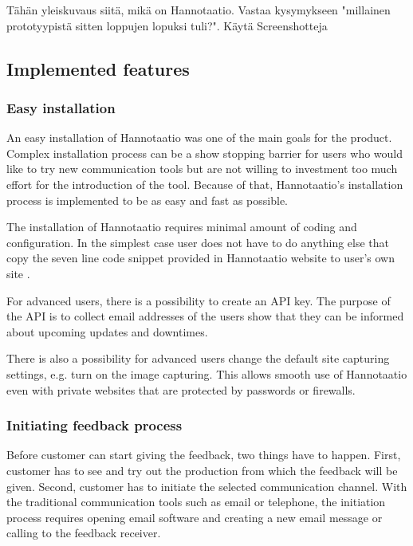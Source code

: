 \documentclass[english,12pt,a4paper,pdftex]{article}
\begin{document}
Tähän yleiskuvaus siitä, mikä on Hannotaatio. Vastaa kysymykseen "millainen prototyypistä sitten loppujen lopuksi tuli?". Käytä Screenshotteja

\subsection{Implemented features}

\subsubsection{Easy installation}

An easy installation of Hannotaatio was one of the main goals for the product. Complex installation process can be a show stopping barrier for users who would like to try new communication tools but are not willing to investment too much effort for the introduction of the tool. Because of that, Hannotaatio's installation process is implemented to be as easy and fast as possible.

The installation of Hannotaatio requires minimal amount of coding and configuration. In the simplest case user does not have to do anything else that copy the seven line code snippet provided in Hannotaatio website to user's own site \citep{hannotaatio}.

For advanced users, there is a possibility to create an API key. The purpose of the API is to collect email addresses of the users show that they can be informed about upcoming updates and downtimes.

There is also a possibility for advanced users change the default site capturing settings, e.g. turn on the image capturing. This allows smooth use of Hannotaatio even with private websites that are protected by passwords or firewalls.

\subsubsection{Initiating feedback process}

Before customer can start giving the feedback, two things have to happen. First, customer has to see and try out the production from which the feedback will be given. Second, customer has to initiate the selected communication channel. With the traditional communication tools such as email or telephone, the initiation process requires opening email software and creating a new email message or calling to the feedback receiver.
\end{document}
